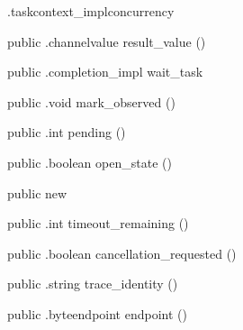 \begin{CrexxClass}{.taskcontext\_impl}{concurrency}
\begin{Members}
    \Method
      {public}
      {.channelvalue}
      {result\_value}
      {()}

    \Method
      {public}
      {.completion\_impl}
      {wait\_task}
      {}

    \Method
      {public}
      {.void}
      {mark\_observed}
      {()}

    \Method
      {public}
      {.int}
      {pending}
      {()}

    \Method
      {public}
      {.boolean}
      {open\_state}
      {()}

    \Factory
      {public}
      {new}
      {}

    \Method
      {public}
      {.int}
      {timeout\_remaining}
      {()}

    \Method
      {public}
      {.boolean}
      {cancellation\_requested}
      {()}

    \Method
      {public}
      {.string}
      {trace\_identity}
      {()}

    \Method
      {public}
      {.byteendpoint}
      {endpoint}
      {()}

  \end{Members}
\end{CrexxClass}

